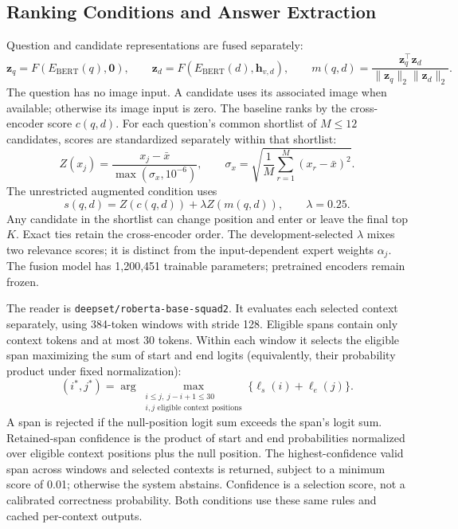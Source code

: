 \documentclass[10pt,a4paper]{article}
\newcommand{\model}[1]{\texttt{\small #1}}
\begin{document}
\subsection{Ranking Conditions and Answer Extraction}
Question and candidate representations are fused separately:
\begin{equation}
\mathbf z_q=F(E_{\mathrm{BERT}}(q),\mathbf0),\qquad
\mathbf z_d=F(E_{\mathrm{BERT}}(d),\mathbf h_{v,d}),\qquad
m(q,d)=\frac{\mathbf z_q^\top\mathbf z_d}{\|\mathbf z_q\|_2\|\mathbf z_d\|_2}.
\end{equation}
The question has no image input. A candidate uses its associated image when available; otherwise its image input is zero. The baseline ranks by the cross-encoder score $c(q,d)$. For each question's common shortlist of $M\leq12$ candidates, scores are standardized separately within that shortlist:
\begin{equation}
Z(x_j)=\frac{x_j-\bar x}{\max(\sigma_x,10^{-6})},\qquad
\sigma_x=\sqrt{\frac{1}{M}\sum_{r=1}^{M}(x_r-\bar x)^2}.
\end{equation}
The unrestricted augmented condition uses
\begin{equation}
s(q,d)=Z(c(q,d))+\lambda Z(m(q,d)),\qquad\lambda=0.25.
\end{equation}
Any candidate in the shortlist can change position and enter or leave the final top $K$. Exact ties retain the cross-encoder order. The development-selected $\lambda$ mixes two relevance scores; it is distinct from the input-dependent expert weights $\alpha_j$. The fusion model has 1,200,451 trainable parameters; pretrained encoders remain frozen.

The reader is \model{deepset/roberta-base-squad2}. It evaluates each selected context separately, using 384-token windows with stride 128. Eligible spans contain only context tokens and at most 30 tokens. Within each window it selects the eligible span maximizing the sum of start and end logits (equivalently, their probability product under fixed normalization):
\begin{equation}
(i^*,j^*)=\arg\max_{\substack{i\leq j,\ j-i+1\leq30\\i,j\text{ eligible context positions}}}
\{\ell_s(i)+\ell_e(j)\}.
\end{equation}
A span is rejected if the null-position logit sum exceeds the span's logit sum. Retained-span confidence is the product of start and end probabilities normalized over eligible context positions plus the null position. The highest-confidence valid span across windows and selected contexts is returned, subject to a minimum score of 0.01; otherwise the system abstains. Confidence is a selection score, not a calibrated correctness probability. Both conditions use these same rules and cached per-context outputs.
\end{document}
